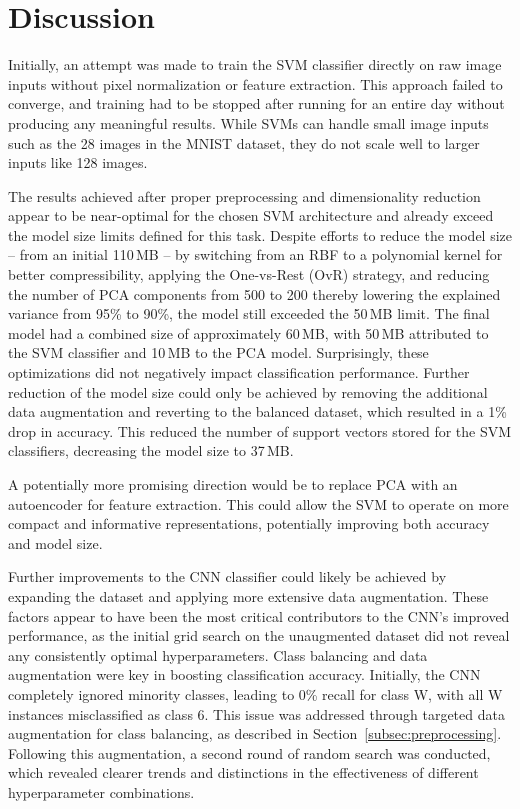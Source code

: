 \documentclass[a4, 10 pt, conference]{ieeeconf}  %
\begin{document}
\section{Discussion}
\label{sec:discuss}

Initially, an attempt was made to train the SVM classifier directly on raw image inputs without pixel normalization or feature extraction. This approach failed to converge, and training had to be stopped after running for an entire day without producing any meaningful results. While SVMs can handle small image inputs such as the 28 images in the MNIST dataset, they do not scale well to larger inputs like 128 images.

The results achieved after proper preprocessing and dimensionality reduction appear to be near-optimal for the chosen SVM architecture and already exceed the model size limits defined for this task. Despite efforts to reduce the model size -- from an initial 110\,MB -- by switching from an RBF to a polynomial kernel for better compressibility, applying the One-vs-Rest (OvR) strategy, and reducing the number of PCA components from 500 to 200 thereby lowering the explained variance from 95\% to 90\%, the model still exceeded the 50\,MB limit. The final model had a combined size of approximately 60\,MB, with 50\,MB attributed to the SVM classifier and 10\,MB to the PCA model.
Surprisingly, these optimizations did not negatively impact classification performance. Further reduction of the model size could only be achieved by removing the additional data augmentation and reverting to the balanced dataset, which resulted in a 1\% drop in accuracy. This reduced the number of support vectors stored for the SVM classifiers, decreasing the model size to 37\,MB.

A potentially more promising direction would be to replace PCA with an autoencoder for feature extraction. This could allow the SVM to operate on more compact and informative representations, potentially improving both accuracy and model size.

Further improvements to the CNN classifier could likely be achieved by expanding the dataset and 
applying more extensive data augmentation. These factors appear to have been the most critical contributors to the CNN's 
improved performance, as the initial grid search on the unaugmented dataset did not reveal any consistently optimal 
hyperparameters. Class balancing and data augmentation were key in boosting classification accuracy. Initially, the CNN 
completely ignored minority classes, leading to 0\% recall for class W, with all W instances misclassified as class 6. 
This issue was addressed through targeted data augmentation for class balancing, as described in Section~\ref{subsec:preprocessing}. 
Following this augmentation, a second round of random search was conducted, which revealed clearer trends and distinctions 
in the effectiveness of different hyperparameter combinations.
\end{document}
